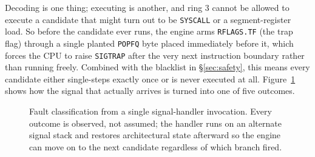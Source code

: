 \documentclass[11pt]{article}
\newcommand{\code}[1]{\texttt{#1}}
\begin{document}
Decoding is one thing; executing is another, and ring 3 cannot be
allowed to execute a candidate that might turn out to be \code{SYSCALL}
or a segment-register load. So before the candidate ever runs, the
engine arms \code{RFLAGS.TF} (the trap flag) through a single planted
\code{POPFQ} byte placed immediately before it, which forces the CPU to
raise \code{SIGTRAP} after the very next instruction boundary rather
than running freely. Combined with the blacklist in
\S\ref{sec:safety}, this means every candidate either single-steps
exactly once or is never executed at all. Figure~\ref{fig:classify}
shows how the signal that actually arrives is turned into one of five
outcomes.

\begin{figure}[H]
\centering
{}
\caption{Fault classification from a single signal-handler invocation.
Every outcome is observed, not assumed; the handler runs on an
alternate signal stack and restores architectural state afterward so
the engine can move on to the next candidate regardless of which branch
fired.}
\label{fig:classify}
\end{figure}
\end{document}
